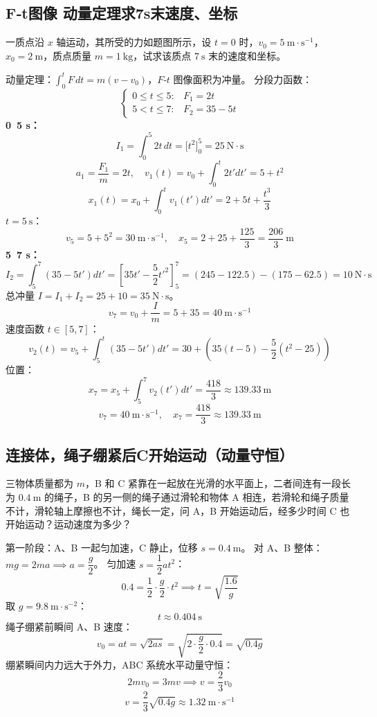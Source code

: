 \subsection{F‑t图像 动量定理求7s末速度、坐标}
一质点沿 $x$ 轴运动，其所受的力如题图所示，设 $t=0$ 时，$v_0=5\ \mathrm{m\cdot s^{-1}}$，$x_0=2\ \mathrm{m}$，质点质量 $m=1\ \mathrm{kg}$，试求该质点 $7\ \mathrm{s}$ 末的速度和坐标。
\begin{solution}
动量定理：$\displaystyle \int_{0}^{t} F\,dt = m(v-v_0)$，$F$‑$t$ 图像面积为冲量。
分段力函数：
\[
\begin{cases}
0\le t\le 5\colon & F_1 = 2t \\
5< t\le 7\colon & F_2 = 35 -5t
\end{cases}
\]
\textbf{0~5 s：}
\[
I_1=\int_0^5 2t\,dt = \big[t^2\big]_0^5=25\ \mathrm{N\cdot s}
\]
\[
a_1=\frac{F_1}{m}=2t,\quad
v_1(t) = v_0+\int_0^t 2t'dt' = 5 + t^2
\]
\[
x_1(t)=x_0+\int_0^t v_1(t')dt' = 2 +5t+\frac{t^3}{3}
\]
$t=5\ \mathrm{s}$：
\[
v_5=5+5^2=30\ \mathrm{m\cdot s^{-1}},\quad
x_5=2+25+\frac{125}{3}=\frac{206}{3}\ \mathrm{m}
\]
\textbf{5~7 s：}
\[
I_2=\int_{5}^{7}(35-5t')dt'
=\left[35t'-\frac52 t'^2\right]_{5}^{7}
=(245-122.5)-(175-62.5)=10\ \mathrm{N\cdot s}
\]
总冲量 $I=I_1+I_2=25+10=35\ \mathrm{N\cdot s}$。
\[
v_7 = v_0+\frac{I}{m}=5+35=40\ \mathrm{m\cdot s^{-1}}
\]
速度函数 $t\in[5,7]$：
\[
v_2(t)=v_5+\int_{5}^{t}(35-5t')dt'
=30+\left(35(t-5)-\frac52(t^2-25)\right)
\]
位置：
\[
x_7 = x_5+\int_{5}^{7} v_2(t')dt' =\frac{418}{3}\approx 139.33\ \mathrm{m}
\]
\[
\boxed{v_7=40\ \mathrm{m\cdot s^{-1}},\quad x_7=\frac{418}{3}\approx 139.33\ \mathrm{m}}
\]
\end{solution}
\subsection{连接体，绳子绷紧后C开始运动（动量守恒）}
三物体质量都为 $m$，B 和 C 紧靠在一起放在光滑的水平面上，二者间连有一段长为 $0.4\ \mathrm{m}$ 的绳子，B 的另一侧的绳子通过滑轮和物体 A 相连，若滑轮和绳子质量不计，滑轮轴上摩擦也不计，绳长一定，问 A，B 开始运动后，经多少时间 C 也开始运动？运动速度为多少？
\begin{solution}
第一阶段：A、B 一起匀加速，C 静止，位移 $s=0.4\ \mathrm{m}$。
对 A、B 整体：$mg = 2ma \implies a=\dfrac{g}{2}$。
匀加速 $s=\dfrac12 a t^2$：
\[
0.4 = \frac12 \cdot \frac{g}{2} \cdot t^2
\implies t=\sqrt{\frac{1.6}{g}}
\]
取 $g=9.8\ \mathrm{m\cdot s^{-2}}$：
\[
\boxed{t \approx 0.404\ \mathrm{s}}
\]
绳子绷紧前瞬间 A、B 速度：
\[
v_0 = a t = \sqrt{2 a s} = \sqrt{2\cdot \frac{g}{2}\cdot 0.4}=\sqrt{0.4g}
\]
绷紧瞬间内力远大于外力，ABC 系统水平动量守恒：
\[
2m v_0 = 3m v
\implies v=\frac23 v_0
\]
\[
\boxed{v = \frac{2}{3}\sqrt{0.4g}\approx 1.32\ \mathrm{m\cdot s^{-1}}}
\]
\end{solution}
